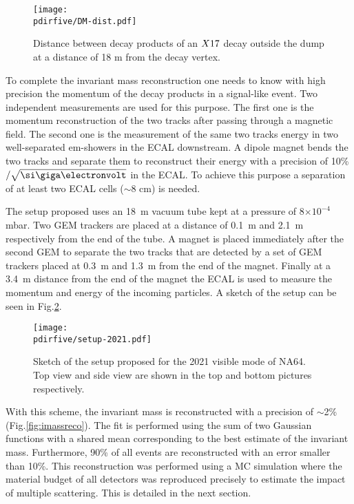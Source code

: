 \begin{figure}[tbh!]
  \centering
  \texttt{[image: \\pdirfive/DM-dist.pdf]}
  \caption[Distance of the decay products of X17 in the 2021 setup]{Distance between decay products of an $X17$ decay outside the dump at a distance of 18 m from the decay vertex.}
  \label{fig:dm_dist1}
\end{figure}

To complete the invariant mass reconstruction one needs to know with high precision the momentum of the decay products in a signal-like event. Two independent measurements are used for this purpose. The first one is the momentum reconstruction of the two tracks after passing through a magnetic field. The second one is the measurement of the same two tracks energy in two well-separated em-showers in the ECAL downstream. A dipole magnet bends the two tracks and separate them to reconstruct their energy with a precision of 10\%$/\sqrt{\gev}$ in the ECAL. To achieve this purpose a separation of at least two ECAL cells ($\sim 8$ \si{\centi\meter}) is needed.

The setup proposed uses an \SI{18}{\meter} vacuum tube kept at a pressure of 8$\times 10^{-4}$ \si{\milli\bar}. Two GEM trackers \cite{gem} are placed at a distance of \SI{0.1}{\meter} and \SI{2.1}{\meter} respectively from the end of the tube. A magnet is placed immediately after the second GEM to separate the two tracks that are detected by a set of GEM trackers placed at \SI{0.3}{\meter} and \SI{1.3}{\meter} from the end of the magnet. Finally at a \SI{3.4}{\meter} distance from the end of the magnet the ECAL is used to measure the momentum and energy of the incoming particles. A sketch of the setup can be seen in Fig.\ref{fig:setup-2021}.

\begin{figure}[tbh!]
  \centering
  \texttt{[image: \\pdirfive/setup-2021.pdf]}
  \caption[2021 setup]{Sketch of the setup proposed for the 2021 visible mode of NA64. Top view and side view are shown in the top and bottom pictures respectively.}
  \label{fig:setup-2021}
\end{figure}

With this scheme, the invariant mass is reconstructed with a precision of $\sim$2\% (Fig.\ref{fig:imassreco}). The fit is performed using the sum of two Gaussian functions with a shared mean corresponding to the best estimate of the invariant mass. Furthermore, 90\% of all events are reconstructed with an error smaller than 10\%. This reconstruction was performed using a MC simulation where the material budget of all detectors was reproduced precisely to estimate the impact of multiple scattering. This is detailed in the next section.

